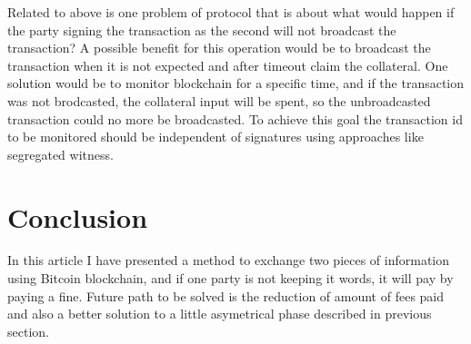 \documentclass[]{article}
\begin{document}
Related to above is one problem of protocol that is about what would happen if the party signing the transaction as the second will not broadcast the transaction? A possible benefit for this operation would be to broadcast the transaction when it is not expected and after timeout claim the collateral. One solution would be to monitor blockchain for a specific time, and if the transaction was not brodcasted, the collateral input will be spent, so the unbroadcasted transaction could no more be broadcasted. To achieve this goal the transaction id to be monitored should be independent of signatures using approaches like segregated witness\cite{segwit}.

\section{Conclusion}

In this article I have presented a method to exchange two pieces of information using Bitcoin blockchain, and if one party is not keeping it words, it will pay by paying a fine. Future path to be solved is the reduction of amount of fees paid and also a better solution to a little asymetrical phase described in previous section.
\end{document}
